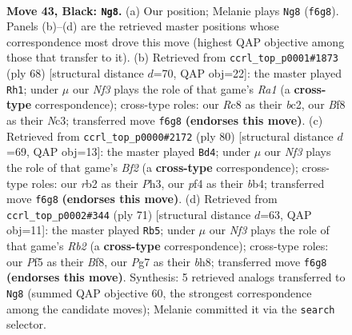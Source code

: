 \documentclass[11pt]{article}
\begin{document}
\clearpage

\begin{figure}[p]\centering
\begin{subfigure}{0.46\textwidth}\centering
\resizebox{\linewidth}{!}{%
\newchessgame
\chessboard[
  setfen={2r2b2/p5p1/P1b2nk1/1p3p1p/1P3P2/4P1PK/1R6/RNB5 b - - 1 43},
  showmover=false,
  pgfstyle=straightmove, color=movearrow, markmove={f6-g8}
]}
\caption{}
\end{subfigure}\hfill
\begin{subfigure}{0.46\textwidth}\centering
\resizebox{\linewidth}{!}{%
\newchessgame
\chessboard[
  setfen={6k1/5p2/4pBp1/4P3/pr2p2P/2Nn2K1/P1b2PP1/R7 w - - 5 35},
  showmover=false,
  pgfstyle=straightmove, color=movearrow, markmove={a1-h1}
]}
\caption{}
\end{subfigure}
\\[4pt]
\begin{subfigure}{0.46\textwidth}\centering
\resizebox{\linewidth}{!}{%
\newchessgame
\chessboard[
  setfen={2R5/p3r1k1/1p3ppp/1B2n3/Pb4P1/1P4PP/5BK1/8 w - - 3 41},
  showmover=false,
  pgfstyle=straightmove, color=movearrow, markmove={f2-d4}
]}
\caption{}
\end{subfigure}\hfill
\begin{subfigure}{0.46\textwidth}\centering
\resizebox{\linewidth}{!}{%
\newchessgame
\chessboard[
  setfen={5b1B/1r1p1k1p/2n3p1/p7/4b3/1p2N2P/1P3PP1/R3R1K1 b - - 3 36},
  showmover=false,
  pgfstyle=straightmove, color=movearrow, markmove={b7-b5}
]}
\caption{}
\end{subfigure}
\caption{\textbf{Move 43, Black: \texttt{Ng8}.} (a) Our position; Melanie plays \texttt{Ng8} (\texttt{f6g8}). Panels (b)--(d) are the retrieved master positions whose correspondence most drove this move (highest QAP objective among those that transfer to it). (b) Retrieved from \texttt{ccrl\_top\_p0001\#1873} (ply 68) [structural distance $d$=70, QAP obj=22]: the master played \texttt{Rh1}; under $\mu$ our \emph{Nf3} plays the role of that game's \emph{Ra1} (a \textbf{cross-type} correspondence); cross-type roles: our \emph{R}c8 as their \emph{b}c2, our \emph{B}f8 as their \emph{N}c3; transferred move \texttt{f6g8} \textbf{(endorses this move)}. (c) Retrieved from \texttt{ccrl\_top\_p0000\#2172} (ply 80) [structural distance $d$=69, QAP obj=13]: the master played \texttt{Bd4}; under $\mu$ our \emph{Nf3} plays the role of that game's \emph{Bf2} (a \textbf{cross-type} correspondence); cross-type roles: our \emph{r}b2 as their \emph{P}h3, our \emph{p}f4 as their \emph{b}b4; transferred move \texttt{f6g8} \textbf{(endorses this move)}. (d) Retrieved from \texttt{ccrl\_top\_p0002\#344} (ply 71) [structural distance $d$=63, QAP obj=11]: the master played \texttt{Rb5}; under $\mu$ our \emph{Nf3} plays the role of that game's \emph{Rb2} (a \textbf{cross-type} correspondence); cross-type roles: our \emph{P}f5 as their \emph{B}f8, our \emph{P}g7 as their \emph{b}h8; transferred move \texttt{f6g8} \textbf{(endorses this move)}. Synthesis: 5 retrieved analogs transferred to \texttt{Ng8} (summed QAP objective 60, the strongest correspondence among the candidate moves); Melanie committed it via the \texttt{search} selector.}
\label{fig:thought-m85}
\end{figure}
\end{document}
